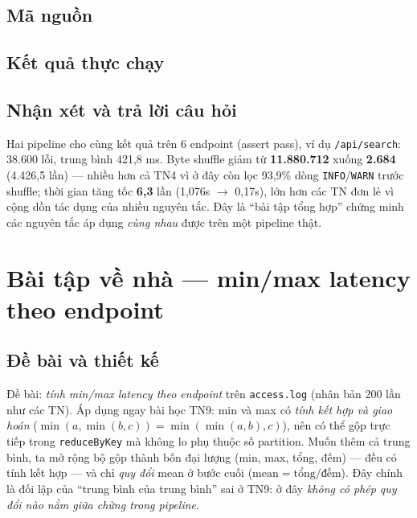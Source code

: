 \documentclass[12pt,a4paper,oneside]{article}
\begin{document}
\subsection{Mã nguồn}



\subsection{Kết quả thực chạy}



\subsection{Nhận xét và trả lời câu hỏi}

Hai pipeline cho cùng kết quả trên 6 endpoint (assert pass), ví dụ \texttt{/api/search}: 38.600 lỗi, trung bình 421,8 ms. Byte shuffle giảm từ \textbf{11.880.712} xuống \textbf{2.684} (4.426,5 lần) --- nhiều hơn cả TN4 vì ở đây còn lọc 93,9\% dòng \texttt{INFO}/\texttt{WARN} trước shuffle; thời gian tăng tốc \textbf{6,3} lần (1,076s $\to$ 0,17s), lớn hơn các TN đơn lẻ vì cộng dồn tác dụng của nhiều nguyên tắc. Đây là ``bài tập tổng hợp'' chứng minh các nguyên tắc áp dụng \emph{cùng nhau} được trên một pipeline thật.

\section{Bài tập về nhà --- min/max latency theo endpoint}
\label{sec:btvn}

\subsection{Đề bài và thiết kế}

Đề bài: \emph{tính min/max latency theo endpoint} trên \texttt{access.log} (nhân bản 200 lần như các TN). Áp dụng ngay bài học TN9: min và max có \emph{tính kết hợp và giao hoán} ($\min(a, \min(b,c)) = \min(\min(a,b), c)$), nên có thể gộp trực tiếp trong \texttt{reduceByKey} mà không lo phụ thuộc số partition. Muốn thêm cả trung bình, ta mở rộng bộ gộp thành bốn đại lượng (min, max, tổng, đếm) --- đều có tính kết hợp --- và chỉ \emph{quy đổi} mean ở bước cuối ($\text{mean} = \text{tổng}/\text{đếm}$). Đây chính là đối lập của ``trung bình của trung bình'' sai ở TN9: ở đây \emph{không có phép quy đổi nào nằm giữa chừng trong pipeline}.
\end{document}

